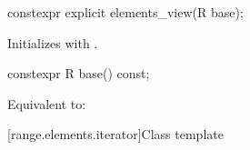 %
\begin{itemdecl}
constexpr explicit elements_view(R base);
\end{itemdecl}

\begin{itemdescr}
\pnum
\effects
Initializes  with .
\end{itemdescr}

%
\begin{itemdecl}
constexpr R base() const;
\end{itemdecl}

\begin{itemdescr}
\pnum
\effects
Equivalent to: 
\end{itemdescr}

[range.elements.iterator]{Class template }

